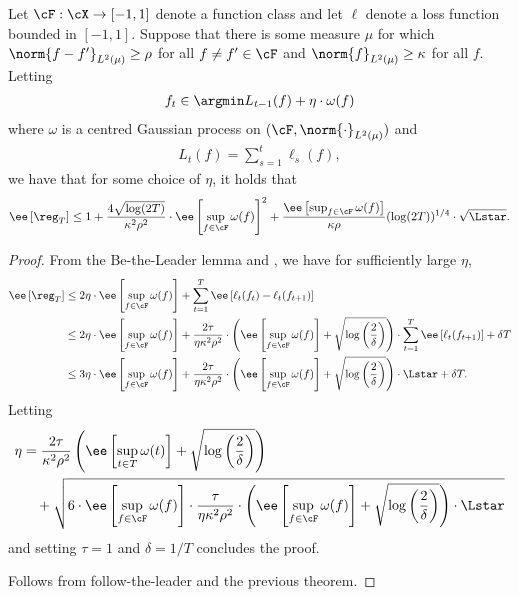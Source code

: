 \begin{theorem}
    Let $\cF: \cX \to [-1,1]$ denote a function class and let $\ell$ denote a loss function bounded in $[-1,1]$.  Suppose that there is some measure $\mu$ for which $\norm{f - f'}_{L^2(\mu)} \geq \rho$ for all $f \neq f' \in \cF$ and $\norm{f}_{L^2(\mu)} \geq \kappa$ for all $f$.  Letting
    \begin{align}
        f_t \in \argmin L_{t-1}(f) + \eta \cdot \omega(f)
    \end{align}
    where $\omega$ is a centred Gaussian process on $(\cF, \norm{\cdot}_{L^2(\mu)})$ and
    \begin{align}
        L_t(f) = \sum_{s = 1}^t \ell_s(f),
    \end{align}
    we have that for some choice of $\eta$, it holds that
    \begin{align}
        \ee\left[ \reg_T \right] \leq 1 + \frac{4\sqrt{\log(2T)}}{\kappa^2 \rho^2} \cdot \ee\left[ \sup_{f \in \cF} \omega(f) \right]^2 + \frac{\ee\left[ \sup_{f \in \cF} \omega(f) \right] }{\kappa \rho} (\log(2T))^{1/4} \cdot \sqrt{\Lstar}.
    \end{align}
\end{theorem}
\begin{proof}
    From the Be-the-Leader lemma  and , we have for sufficiently large $\eta$,
    \begin{align}
        \ee\left[ \reg_T \right] &\leq 2 \eta \cdot \ee\left[ \sup_{f \in \cF} \omega(f) \right] + \sum_{t = 1}^T \ee\left[\ell_t(f_t) - \ell_t(f_{t+1})\right] \\
        &\leq 2 \eta \cdot \ee\left[ \sup_{f \in \cF} \omega(f) \right] +\frac{2 \tau }{ \eta \kappa^2  \rho^2}  \cdot\left( \ee\left[ \sup_{f \in \cF} \omega(f) \right] + \sqrt{\log\left( \frac 2\delta \right)}\right) \cdot \sum_{t = 1}^T \ee\left[ \ell_t(f_{t+1}) \right] + \delta T \\
        &\leq 3 \eta \cdot \ee\left[ \sup_{f \in \cF} \omega(f) \right] +\frac{2 \tau }{ \eta \kappa^2  \rho^2}  \cdot\left( \ee\left[ \sup_{f \in \cF} \omega(f) \right] + \sqrt{\log\left( \frac 2\delta \right)}\right) \cdot \Lstar + \delta T.
    \end{align}
    Letting
    \begin{align}
        \eta &= \frac{2\tau}{\kappa^2 \rho^2} \left( \ee\left[ \sup_{t \in T} \omega(t) \right] + \sqrt{\log\left( \frac 2\delta \right)} \right) \\
        &\quad+ \sqrt{6 \cdot \ee\left[ \sup_{f \in \cF} \omega(f) \right] \cdot \frac{\tau }{ \eta \kappa^2  \rho^2}  \cdot\left( \ee\left[ \sup_{f \in \cF} \omega(f) \right] + \sqrt{\log\left( \frac 2\delta \right)}\right) \cdot \Lstar}
    \end{align}
    and setting $\tau = 1$ and $\delta = 1/T$ concludes the proof.



    Follows from follow-the-leader and the previous theorem. 
\end{proof}
